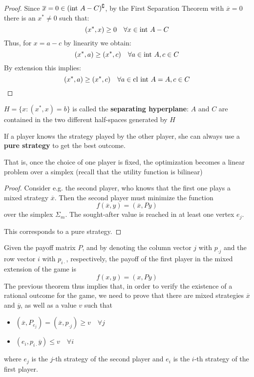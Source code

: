 \documentclass[../main.tex]{subfiles}
\begin{document}
\begin{proof}
    Since $\overline{x} = 0 \in (\operatorname{int\,} A - C)^\complement$, by the First Separation Theorem with  $\overline{x} = 0$ there is an $x^* \neq 0$ such that:
    \[
        (x^*, x) \geq 0 \quad \forall x \in \operatorname{int\,} A - C
    \]
    Thus, for $x = a - c$ by linearity we obtain:
    \[
        (x^*, a) \geq (x^*, c) \quad \forall a \in \operatorname{int\,} A, c \in C
    \]
    By extension this implies:
    \[
        (x^*, a) \geq (x^*, c) \quad \forall a \in \operatorname{cl\,} \operatorname{int\,} A = A, c \in C
    \]
\end{proof}
$H = \{x : (x^*,x) = b\}$ is called the \textbf{separating hyperplane}: $A$ and $C$ are contained in the two different half-spaces generated by $H$

\begin{theorem}
    If a player knows the strategy played by the other player, she can always use a \textbf{pure strategy} to get the best outcome.
\end{theorem}
That is, once the choice of one player is fixed, the optimization becomes a linear problem over a simplex (recall that the utility function is bilinear)
\begin{proof}
    Consider e.g. the second player, who knows that the first one plays a mixed strategy $\overline{x}$. Then the second player must minimize the function
    \[
        f(\overline{x}, y) = (\overline{x}, Py)
    \]
    over the simplex $\Sigma_m$. The sought-after value is reached in at least one vertex $e_j$.

    This corresponds to a pure strategy.
\end{proof}

Given the payoff matrix $P$, and by denoting the column vector $j$ with $p_{\cdot j}$ and the row vector $i$ with $p_{i \cdot}$, respectively, the payoff of the first player in the mixed extension of the game is
\[
    f(x,y) = (x, Py)
\]
The previous theorem thus implies that, in order to verify the existence of a rational outcome for the game, we need to prove that there are mixed strategies $\overline{x}$ and $\overline{y}$, as well as a value $v$ such that
\begin{itemize}
    \item $(\overline{x}, P_{e_j}) = (\overline{x}, p_{\cdot j}) \geq v \quad \forall j$
    \item $(e_i, p_{i \cdot} \overline{y}) \leq v \quad \forall i$
\end{itemize}

where $e_j$ is the $j$-th strategy of the second player and $e_i$ is the $i$-th strategy of the
first player.
\end{document}
